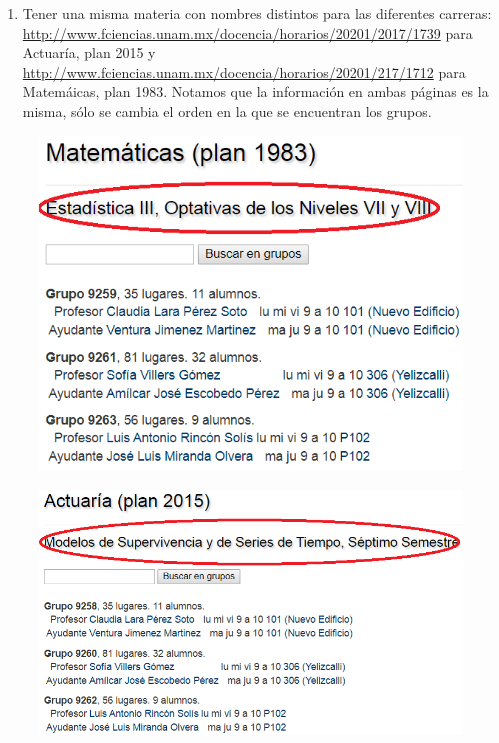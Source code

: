\documentclass[12pt,spanish]{report}
\begin{document}
\begin{itemize}
\begin{enumerate}
\item Tener una misma materia con nombres distintos para las diferentes carreras: \url{http://www.fciencias.unam.mx/docencia/horarios/20201/2017/1739} para Actuaría, plan 2015 y \url{http://www.fciencias.unam.mx/docencia/horarios/20201/217/1712} para Matemáicas, plan 1983. Notamos que la información en ambas páginas es la misma, sólo se cambia el orden en la que se encuentran los grupos.
\end{enumerate}

\begin{figure}[H]
\centering
\includegraphics[scale = 0.45]{InfoRepetida_B_1} %
\end{figure}

\begin{figure}[H]
\centering
\includegraphics[scale = 0.45]{InfoRepetida_B_2} %
\end{figure}



\end{itemize}
\end{document}
